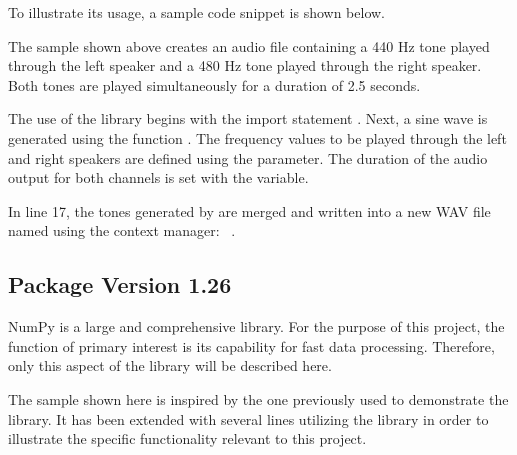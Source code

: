 To illustrate its usage, a sample code snippet is shown below.

\begin{code}[!htp]
	\caption{Generate a stereo sine wave audio signal and save it as a WAV file} 
	\label{Code:Python:File:StereoSineWaveGenerator}
\end{code} 

The sample shown above creates an audio file containing a 440 Hz tone played through the left speaker and a 480 Hz tone played through the right speaker. Both tones are played simultaneously for a duration of 2.5 seconds.

The use of the  library begins with the import statement .  
Next, a sine wave is generated using the function .  
The frequency values to be played through the left and right speakers are defined using the  parameter.  
The duration of the audio output for both channels is set with the  variable.

In line 17, the tones generated by  are merged and written into a new WAV file named  using the context manager:
~\cite{Python:2024Wave}.


\subsection{Package  Version 1.26}

NumPy is a large and comprehensive library.  
For the purpose of this project, the function of primary interest is its capability for fast data processing.  
Therefore, only this aspect of the library will be described here.


\begin{code}[!htp]
	\caption{Record microphone input and compute averaged samples over fixed segments} 
	\label{Code:Python:File:MicAudioAveragingRecorder}
\end{code}    


The sample shown here is inspired by the one previously used to demonstrate the  library.  
It has been extended with several lines utilizing the  library in order to illustrate the specific functionality relevant to this project.

